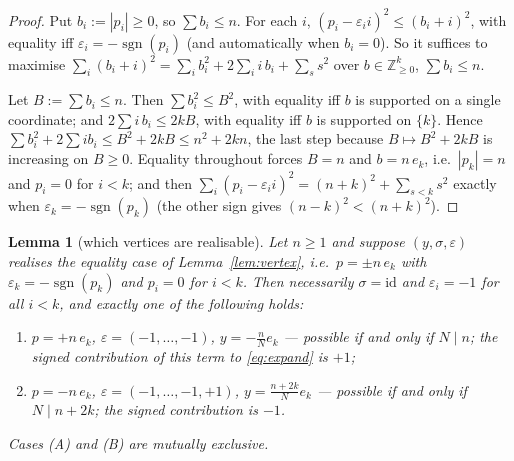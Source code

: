 \documentclass[11pt]{article}
\theoremstyle{plain}
\newtheorem{lemma}[theorem]{Lemma}
\theoremstyle{definition}
\theoremstyle{remark}
\newcommand{\Z}{\mathbb{Z}}
\begin{document}
\begin{proof}
Put $b_i:=|p_i|\ge0$, so $\sum b_i\le n$. For each $i$,
$(p_i-\varepsilon_i i)^2\le(b_i+i)^2$, with equality iff $\varepsilon_i=-\operatorname{sgn}(p_i)$
(and automatically when $b_i=0$). So it suffices to maximise
$\sum_i (b_i+i)^2=\sum_i b_i^2+2\sum_i i\,b_i+\sum_s s^2$ over $b\in\Z_{\ge0}^k$,
$\sum b_i\le n$.

Let $B:=\sum b_i\le n$. Then $\sum b_i^2\le B^2$, with equality iff $b$ is supported on a
single coordinate; and $2\sum i\,b_i\le 2kB$, with equality iff $b$ is supported on
$\{k\}$. Hence $\sum b_i^2+2\sum i b_i\le B^2+2kB\le n^2+2kn$, the last step because
$B\mapsto B^2+2kB$ is increasing on $B\ge0$. Equality throughout forces $B=n$ and
$b=n\,e_k$, i.e.\ $|p_k|=n$ and $p_i=0$ for $i<k$; and then
$\sum_i(p_i-\varepsilon_i i)^2=(n+k)^2+\sum_{s<k}s^2$ exactly when
$\varepsilon_k=-\operatorname{sgn}(p_k)$ (the other sign gives $(n-k)^2<(n+k)^2$).
\end{proof}

\begin{lemma}[which vertices are realisable]\label{lem:realise}
Let $n\ge1$ and suppose $(y,\sigma,\varepsilon)$ realises the equality case of
Lemma~\ref{lem:vertex}, i.e.\ $p=\pm n\,e_k$ with
$\varepsilon_k=-\operatorname{sgn}(p_k)$ and $p_i=0$ for $i<k$. Then necessarily
$\sigma=\mathrm{id}$ and $\varepsilon_i=-1$ for all $i<k$, and exactly one of the
following holds:
\begin{enumerate}
\item[\textup{(B)}] $p=+n\,e_k$, $\varepsilon=(-1,\dots,-1)$, $y=-\tfrac nN e_k$ --- possible
  if and only if $N\mid n$; the signed contribution of this term to \eqref{eq:expand} is $+1$;
\item[\textup{(A)}] $p=-n\,e_k$, $\varepsilon=(-1,\dots,-1,+1)$, $y=\tfrac{n+2k}{N}e_k$ ---
  possible if and only if $N\mid n+2k$; the signed contribution is $-1$.
\end{enumerate}
Cases (A) and (B) are mutually exclusive.
\end{lemma}
\end{document}
